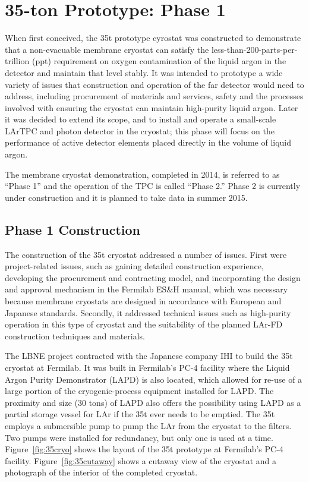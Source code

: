 \section{35-ton Prototype: Phase 1}
\label{35tonprototype}

When first conceived, the 35t prototype cyrostat was constructed to demonstrate that a non-evacuable membrane cryostat can satisfy the less-than-200-parts-per-trillion (ppt) requirement on oxygen contamination of the liquid argon in the detector and maintain that level stably.
%
It was intended to prototype a wide variety of issues that construction and 
operation of the far detector would need to address, including procurement of 
materials and services, safety and the processes involved with ensuring the 
cryostat can maintain high-purity liquid argon. 
%
Later it was decided to extend its scope, and to install and operate a small-scale LArTPC and photon detector in the cryostat; this phase will focus on the performance of active detector elements placed directly in the volume of liquid argon.

The membrane cryostat demonstration, completed in 2014, is referred to as ``Phase 1'' and the operation of the TPC is called ``Phase 2.''
Phase 2 is currently under construction and it is planned to take data in summer 2015.



\subsection{Phase 1 Construction}
\label{sec:rnd:35t1:construction}

The construction of the 35t cryostat addressed a number of issues.
First were project-related issues, such as gaining detailed construction experience, 
developing the procurement and contracting model, and incorporating the design and approval mechanism 
in the Fermilab ES\&H manual, which was necessary because membrane cryostats are designed in accordance
with European and Japanese standards.
Secondly, it addressed technical issues such as %
high-purity operation in this type of 
cryostat and the suitability of the planned LAr-FD construction techniques and materials.

The LBNE project contracted with the Japanese company IHI to build the 35t cryostat at Fermilab.  
It was built in Fermilab's PC-4 facility where the Liquid Argon Purity Demonstrator (LAPD)
\cite{bib:lapdP07005}
is also located, which
allowed for re-use of a large portion of the cryogenic-process equipment installed for LAPD.
The proximity and size (30 tons) of LAPD also offers the possibility using LAPD as 
a partial storage vessel for LAr if the 35t ever needs to be emptied. 
The 35t employs a submersible %
pump to pump the LAr from the cryostat to the filters. Two pumps were installed for redundancy, but 
only one is used at a time.
Figure~\ref{fig:35cryo} shows the layout of the 35t prototype at 
Fermilab's PC-4 facility. 
Figure~\ref{fig:35cutaway} shows a cutaway view of the cryostat and a photograph of the interior
of the completed cryostat. 

